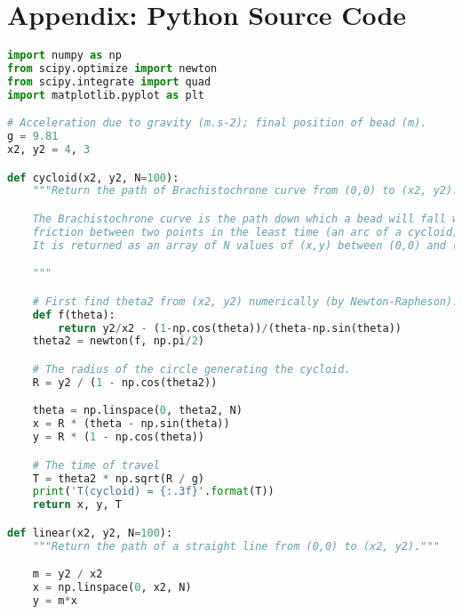 \newpage

        

	\section{Appendix: Python Source Code}
        
        \begin{lstlisting}[language=Python, caption=\textit{Python Script for the Brachistochrone system}]
import numpy as np
from scipy.optimize import newton
from scipy.integrate import quad
import matplotlib.pyplot as plt

# Acceleration due to gravity (m.s-2); final position of bead (m).
g = 9.81
x2, y2 = 4, 3

def cycloid(x2, y2, N=100):
    """Return the path of Brachistochrone curve from (0,0) to (x2, y2).

    The Brachistochrone curve is the path down which a bead will fall without
    friction between two points in the least time (an arc of a cycloid).
    It is returned as an array of N values of (x,y) between (0,0) and (x2,y2).

    """

    # First find theta2 from (x2, y2) numerically (by Newton-Rapheson).
    def f(theta):
        return y2/x2 - (1-np.cos(theta))/(theta-np.sin(theta))
    theta2 = newton(f, np.pi/2)

    # The radius of the circle generating the cycloid.
    R = y2 / (1 - np.cos(theta2))

    theta = np.linspace(0, theta2, N)
    x = R * (theta - np.sin(theta))
    y = R * (1 - np.cos(theta))

    # The time of travel
    T = theta2 * np.sqrt(R / g)
    print('T(cycloid) = {:.3f}'.format(T))
    return x, y, T

def linear(x2, y2, N=100):
    """Return the path of a straight line from (0,0) to (x2, y2)."""

    m = y2 / x2
    x = np.linspace(0, x2, N)
    y = m*x


\end{lstlisting}
